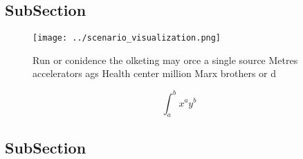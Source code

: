\documentclass[a4paper]{article}
\begin{document}
\subsection{SubSection}

\begin{figure}
\centering
\texttt{[image: ../scenario\_visualization.png]}
\caption{Run or conidence the olketing may orce a single source Metres accelerators ags Health center million Marx brothers or d
}
\end{figure}
 
\[ \int_{a}^{b}{x^{a}y^{b}} \]

\subsection{SubSection}
\end{document}
